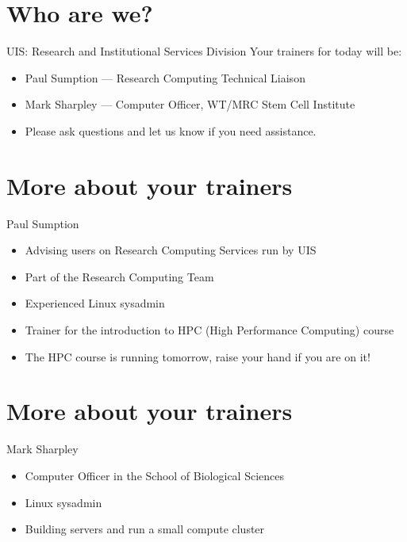 \section{Who are we?}
\begin{frame}{UIS: Research and Institutional Services Division}
Your trainers for today will be:\\
\begin{itemize}
  \item Paul Sumption --- Research Computing Technical Liaison
    \item Mark Sharpley --- Computer Officer, WT/MRC Stem Cell Institute
  \item\alert{Please ask questions and let us know if you need assistance.}
\end{itemize}
\end{frame}

\section{More about your trainers}
\begin{frame}{Paul Sumption}
\begin{itemize}
  \item Advising users on Research Computing Services run by UIS
  \item Part of the Research Computing Team
  \item Experienced Linux sysadmin 
  \item Trainer for the introduction to HPC (High Performance Computing) course
  \item\alert{The HPC course is running tomorrow, raise your hand if you are on it!}
\end{itemize}
\end{frame}

\section{More about your trainers}
\begin{frame}{Mark Sharpley}
\begin{itemize}
  \item Computer Officer in the School of Biological Sciences
  \item Linux sysadmin 
  \item Building servers and run a small compute cluster 
\end{itemize}
\end{frame}

